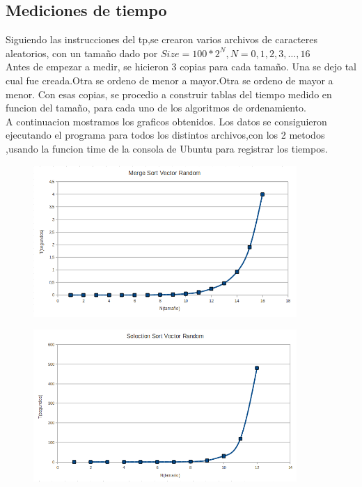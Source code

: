 \subsection{Mediciones de tiempo}
Siguiendo las instrucciones del tp,se crearon varios archivos de caracteres aleatorios, 
con un tamaño dado por $Size = 100*2^N , N=0,1,2,3, \dots ,16$
\\Antes de empezar a medir, se hicieron 3 copias para cada tamaño.
Una se dejo tal cual fue creada.Otra se ordeno de menor a mayor.Otra se ordeno de mayor a menor.
Con esas copias, se procedio a construir tablas del tiempo medido en funcion del tamaño, para cada uno
de los algoritmos de ordenamiento.\\
A continuacion mostramos los graficos obtenidos.
Los datos se consiguieron ejecutando el programa para todos los distintos archivos,con los 2 metodos
,usando la funcion time de la consola de Ubuntu para registrar los tiempos.
\begin{figure}[!htp]
\begin{center}
\includegraphics[width=10cm]{Imagenes/MergeSortVectorRandom.PNG}
\end{center}
\end{figure} 

\begin{figure}[!htp]
\begin{center}
\includegraphics[width=10cm]{Imagenes/SelectionSortVectorRandom.PNG}
\end{center}
\end{figure} 

